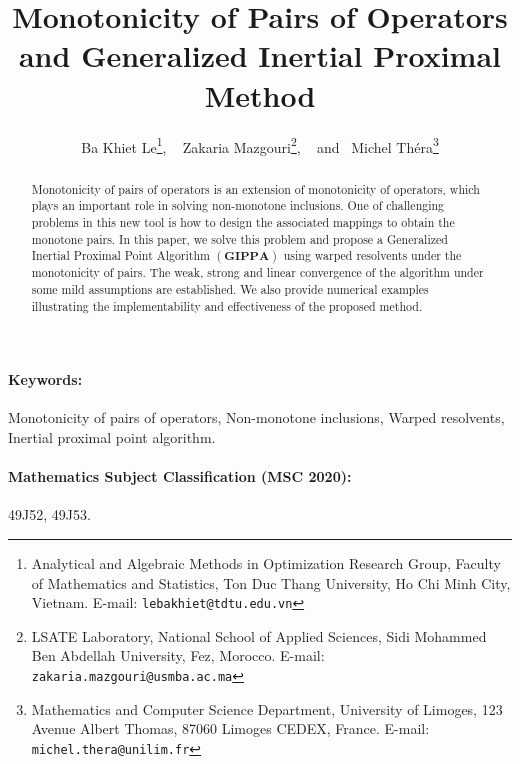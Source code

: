 \documentclass[11pt]{article}
\theoremstyle{definition}
\theoremstyle{definition}
\theoremstyle{definition}
\begin{document}
\title{ Monotonicity of Pairs of Operators and  Generalized Inertial Proximal Method}

\author{
Ba Khiet Le\thanks{Analytical and Algebraic Methods in Optimization Research Group, Faculty of Mathematics and Statistics, Ton Duc Thang University, Ho Chi Minh City, Vietnam. E-mail: \texttt{lebakhiet@tdtu.edu.vn}}, 
~
Zakaria Mazgouri\thanks{LSATE Laboratory, 
National School of Applied Sciences, Sidi Mohammed Ben Abdellah University, Fez, Morocco. E-mail: \texttt{zakaria.mazgouri@usmba.ac.ma}}, ~
and~ 
Michel Th\' era\thanks{Mathematics and Computer Science Department, University of Limoges, 123 Avenue Albert Thomas,
87060 Limoges CEDEX, France. E-mail: \texttt{michel.thera@unilim.fr}}
}


\maketitle


\begin{abstract}
\noindent Monotonicity of pairs of operators is an extension of  monotonicity of operators, which plays an important role in solving non-monotone inclusions. One of  challenging problems in this new tool is how to design the associated mappings to obtain the monotone pairs.  In this paper, we solve this problem and propose a Generalized Inertial Proximal Point Algorithm  \((\mathbf{GIPPA})\) using warped resolvents under the  monotonicity of pairs. The weak, strong and linear convergence of the algorithm under some mild assumptions are established. We also provide numerical examples illustrating the implementability and effectiveness of the proposed method.
\end{abstract}


\paragraph{Keywords:}
Monotonicity of pairs of operators, Non-monotone inclusions,  
Warped resolvents, 
Inertial proximal point algorithm.


\paragraph{Mathematics Subject Classification (MSC 2020):}
 49J52, 49J53.  
\end{document}
